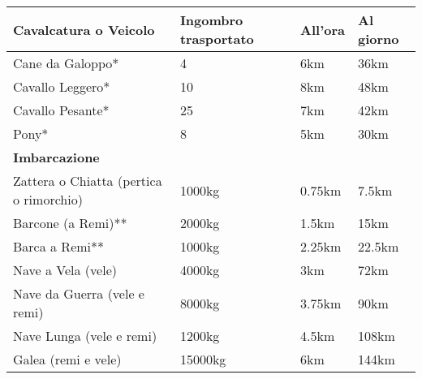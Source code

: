 \documentclass[12pt,a4paper,twoside,openany]{book}
\begin{document}
\begin{tabularx}{0.95\textwidth}{lXXX}
\textbf{Cavalcatura o Veicolo} & \textbf{Ingombro trasportato} & \textbf{All'ora} & \textbf{Al giorno}\\
\toprule
Cane da Galoppo*  & 4 & 6km & 36km  \\
Cavallo Leggero*  & 10  & 8km & 48km  \\
Cavallo Pesante* & 25  & 7km & 42km  \\
Pony* & 8& 5km & 30km  \\
\textbf{Imbarcazione} &  &  & \\
\toprule
Zattera o Chiatta (pertica o rimorchio)  & 1000kg & 0.75km & 7.5km \\
Barcone (a Remi)**  & 2000kg & 1.5km  & 15km  \\
Barca a Remi**  & 1000kg & 2.25km & 22.5km  \\
Nave a Vela (vele)  & 4000kg & 3km  & 72km  \\
Nave da Guerra (vele e remi) & 8000kg & 3.75km & 90km  \\
Nave Lunga (vele e remi)  & 1200kg  & 4.5km  & 108km \\
Galea (remi e vele) & 15000kg & 6km  & 144km \\
\end{tabularx}
\end{document}
